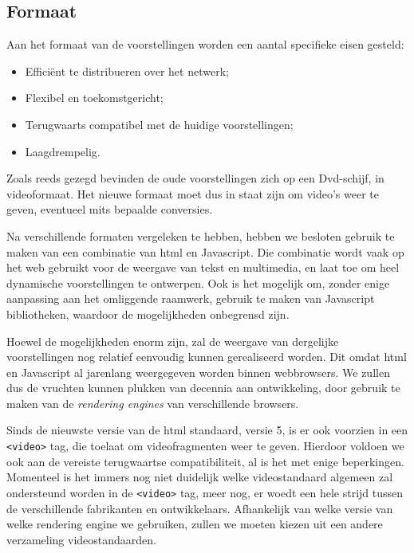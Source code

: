 \subsection{Formaat}

Aan het formaat van de voorstellingen worden een aantal specifieke eisen gesteld:
\begin{itemize}
\item Efficiënt te distribueren over het netwerk;
\item Flexibel en toekomstgericht;
\item Terugwaarts compatibel met de huidige voorstellingen;
\item Laagdrempelig.
\end{itemize}

Zoals reeds gezegd bevinden de oude voorstellingen zich op een Dvd-schijf, in videoformaat. Het nieuwe formaat moet dus in staat zijn om video's weer te geven, eventueel mits bepaalde conversies.

Na verschillende formaten vergeleken te hebben, hebben we besloten gebruik te maken van een combinatie van \ac{html} en Javascript. Die combinatie wordt vaak op het web gebruikt voor de weergave van tekst en multimedia, en laat toe om heel dynamische voorstellingen te ontwerpen. Ook is het mogelijk om, zonder enige aanpassing aan het omliggende raamwerk, gebruik te maken van Javascript bibliotheken, waardoor de mogelijkheden onbegrensd zijn.

Hoewel de mogelijkheden enorm zijn, zal de weergave van dergelijke voorstellingen nog relatief eenvoudig kunnen gerealiseerd worden. Dit omdat \ac{html} en Javascript al jarenlang weergegeven worden binnen webbrowsers. We zullen dus de vruchten kunnen plukken van decennia aan ontwikkeling, door gebruik te maken van de \emph{rendering engines} van verschillende browsers.

Sinds de nieuwste versie van de \ac{html} standaard, versie 5, is er ook voorzien in een \texttt{<video>} tag, die toelaat om videofragmenten weer te geven. Hierdoor voldoen we ook aan de vereiste terugwaartse compatibiliteit, al is het met enige beperkingen. Momenteel is het immers nog niet duidelijk welke videostandaard algemeen zal ondersteund worden in de \texttt{<video>} tag, meer nog, er woedt een hele strijd tussen de verschillende fabrikanten en ontwikkelaars. Afhankelijk van welke versie van welke rendering engine we gebruiken, zullen we moeten kiezen uit een andere verzameling videostandaarden.

